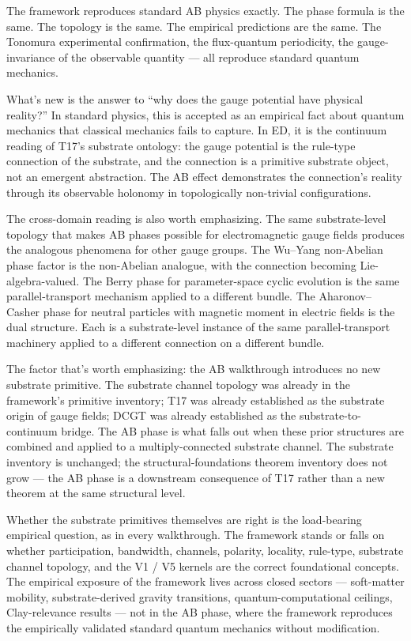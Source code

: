\documentclass[11pt,a4paper]{article}
\begin{document}
The framework reproduces standard AB physics exactly. The phase formula is the same. The topology is the same. The empirical predictions are the same. The Tonomura experimental confirmation, the flux-quantum periodicity, the gauge-invariance of the observable quantity --- all reproduce standard quantum mechanics.

What's new is the answer to ``why does the gauge potential have physical reality?'' In standard physics, this is accepted as an empirical fact about quantum mechanics that classical mechanics fails to capture. In ED, it is the continuum reading of T17's substrate ontology: the gauge potential is the rule-type connection of the substrate, and the connection is a primitive substrate object, not an emergent abstraction. The AB effect demonstrates the connection's reality through its observable holonomy in topologically non-trivial configurations.

The cross-domain reading is also worth emphasizing. The same substrate-level topology that makes AB phases possible for electromagnetic gauge fields produces the analogous phenomena for other gauge groups. The Wu--Yang non-Abelian phase factor is the non-Abelian analogue, with the connection becoming Lie-algebra-valued. The Berry phase for parameter-space cyclic evolution is the same parallel-transport mechanism applied to a different bundle. The Aharonov--Casher phase for neutral particles with magnetic moment in electric fields is the dual structure. Each is a substrate-level instance of the same parallel-transport machinery applied to a different connection on a different bundle.

The factor that's worth emphasizing: the AB walkthrough introduces no new substrate primitive. The substrate channel topology was already in the framework's primitive inventory; T17 was already established as the substrate origin of gauge fields; DCGT was already established as the substrate-to-continuum bridge. The AB phase is what falls out when these prior structures are combined and applied to a multiply-connected substrate channel. The substrate inventory is unchanged; the structural-foundations theorem inventory does not grow --- the AB phase is a downstream consequence of T17 rather than a new theorem at the same structural level.

Whether the substrate primitives themselves are right is the load-bearing empirical question, as in every walkthrough. The framework stands or falls on whether participation, bandwidth, channels, polarity, locality, rule-type, substrate channel topology, and the V1 / V5 kernels are the correct foundational concepts. The empirical exposure of the framework lives across closed sectors --- soft-matter mobility, substrate-derived gravity transitions, quantum-computational ceilings, Clay-relevance results --- not in the AB phase, where the framework reproduces the empirically validated standard quantum mechanics without modification.
\end{document}
